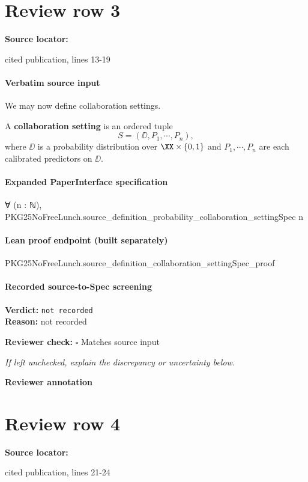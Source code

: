 \documentclass[10pt]{article}
\newcommand{\reviewerbox}{%
  \par\noindent\fbox{\parbox{0.96\linewidth}{\rule{0pt}{0.38in}}}\par
}
\newcommand{\reviewmatch}[1]{%
  \par\noindent\textbf{Reviewer check:} $\square$\; #1\par
  \noindent\emph{If left unchecked, explain the discrepancy or uncertainty below.}\par
}
\begin{document}
\section*{Review row 3}
\textbf{Source locator:} {\footnotesize\raggedright cited publication, lines 13-\allowbreak{}19\par}
\paragraph{Verbatim source input}
\begin{ReviewVerbatim}
We may now define collaboration settings.
\begin{definition}A \textbf{collaboration setting} is an ordered tuple
\begin{equation}
    S=(\DD, P_1, \cdots, P_n),
\end{equation}
where $\DD$ is a probability distribution over $\XX\times \{0,1\}$ and $P_1,\cdots,P_n$ are each calibrated predictors on $\DD$.
\end{definition}
\end{ReviewVerbatim}


\paragraph{Expanded PaperInterface specification}
\begin{ReviewVerbatim}
∀ (n : ℕ), PKG25NoFreeLunch.source_definition_probability_collaboration_settingSpec n
\end{ReviewVerbatim}

\paragraph{Lean proof endpoint (built separately)}\begin{ReviewVerbatim}
PKG25NoFreeLunch.source_definition_collaboration_settingSpec_proof
\end{ReviewVerbatim}

\paragraph{Recorded source-to-Spec screening}
\textbf{Verdict:} \texttt{not recorded}
\\
\textbf{Reason:} not recorded
\reviewmatch{Matches source input}
\noindent\textbf{Reviewer annotation}\par
\reviewerbox
\clearpage
\hypertarget{source-claim-b8bc36d9b34f3b29}{}
\section*{Review row 4}
\textbf{Source locator:} {\footnotesize\raggedright cited publication, lines 21-\allowbreak{}24\par}
\end{document}
